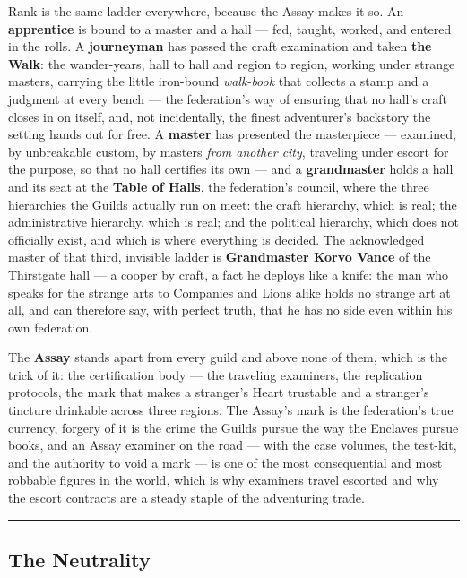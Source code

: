 Rank is the same ladder everywhere, because the Assay makes it so. An \textbf{apprentice} is bound to a master and a hall --- fed, taught, worked, and entered in the rolls. A \textbf{journeyman} has passed the craft examination and taken \textbf{the Walk}: the wander-years, hall to hall and region to region, working under strange masters, carrying the little iron-bound \textit{walk-book} that collects a stamp and a judgment at every bench --- the federation's way of ensuring that no hall's craft closes in on itself, and, not incidentally, the finest adventurer's backstory the setting hands out for free. A \textbf{master} has presented the masterpiece --- examined, by unbreakable custom, by masters \textit{from another city}, traveling under escort for the purpose, so that no hall certifies its own --- and a \textbf{grandmaster} holds a hall and its seat at the \textbf{Table of Halls}, the federation's council, where the three hierarchies the Guilds actually run on meet: the craft hierarchy, which is real; the administrative hierarchy, which is real; and the political hierarchy, which does not officially exist, and which is where everything is decided. The acknowledged master of that third, invisible ladder is \textbf{Grandmaster Korvo Vance} of the Thirstgate hall --- a cooper by craft, a fact he deploys like a knife: the man who speaks for the strange arts to Companies and Lions alike holds no strange art at all, and can therefore say, with perfect truth, that he has no side even within his own federation.

The \textbf{Assay} stands apart from every guild and above none of them, which is the trick of it: the certification body --- the traveling examiners, the replication protocols, the mark that makes a stranger's Heart trustable and a stranger's tincture drinkable across three regions. The Assay's mark is the federation's true currency, forgery of it is the crime the Guilds pursue the way the Enclaves pursue books, and an Assay examiner on the road --- with the case volumes, the test-kit, and the authority to void a mark --- is one of the most consequential and most robbable figures in the world, which is why examiners travel escorted and why the escort contracts are a steady staple of the adventuring trade.

\medskip\hrule\medskip

\subsection{The Neutrality}

